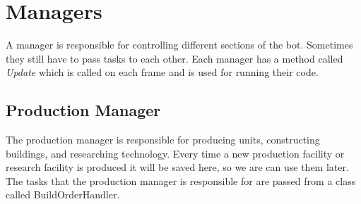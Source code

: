 \section{Managers}
	A manager is responsible for controlling different sections of the bot. Sometimes they still have to pass tasks to each other. Each manager has 
	a method called \textit{Update} which is called on each frame and is used for running their code.
	\subsection{Production Manager}
		The production manager is responsible for producing units, constructing buildings, and researching technology. Every time a new production facility or 
		 research facility is produced it will be saved here, so we are can use them later. 
		The tasks that the production manager is responsible for are passed from a 
		class called BuildOrderHandler.
